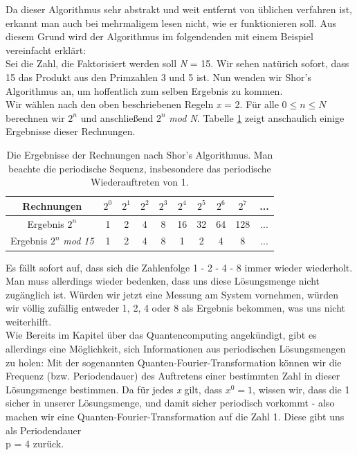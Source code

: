 \documentclass[12pt]{article}
\begin{document}
Da dieser Algorithmus sehr abstrakt und weit entfernt von üblichen verfahren ist, erkannt man auch bei mehrmaligem lesen nicht, wie er funktionieren soll. Aus diesem Grund wird der Algorithmus im folgendenden mit einem Beispiel vereinfacht erklärt: \\

Sei die Zahl, die Faktorisiert werden soll \textit{N} = 15. Wir sehen natürich sofort, dass 15 das Produkt aus den Primzahlen 3 und 5 ist. Nun wenden wir Shor's Algorithmus an, um hoffentlich zum selben Ergebnis zu kommen. \\

Wir wählen nach den oben beschriebenen Regeln \textit{x} = 2. Für alle $0 \leq n \leq N$ berechnen wir $2^n$ und anschließend $2^n$ \textit{mod N}. Tabelle \ref{tab:shor} zeigt anschaulich einige Ergebnisse dieser Rechnungen. \\

\begin{table} [h]
    \centering
    \begin{tabular}{c|c|c|c|c|c|c|c|c|c}
        Rechnungen & $2^0$ & $2^1$ & $2^2$ & $2^3$ & $2^4$ & $2^5$ & $2^6$ & $2^7$ & ...\\
    \hline \hline
        Ergebnis $2^n$ & 1 & 2 & 4 & 8 & 16 & 32 & 64 & 128 & ...\\
    \hline
        Ergebnis $2^n$ \textit{mod 15} & 1 & 2 & 4 & 8 & 1 & 2 & 4 & 8 & ...\\
    \end{tabular}
    \caption{Die Ergebnisse der Rechnungen nach Shor's Algorithmus. Man beachte die periodische Sequenz, insbesondere das periodische Wiederauftreten von 1. \cite{mavroeidis2018impact}}
    \label{tab:shor}
\end{table}

Es fällt sofort auf, dass sich die Zahlenfolge 1 - 2 - 4 - 8 immer wieder wiederholt. Man muss allerdings wieder bedenken, dass uns diese Lösungsmenge nicht zugänglich ist. Würden wir jetzt eine Messung am System vornehmen, würden wir völlig zufällig entweder 1, 2, 4 oder 8 als Ergebnis bekommen, was uns nicht weiterhilft.\\

Wie Bereits im Kapitel über das Quantencomputing angekündigt, gibt es allerdings eine Möglichkeit, sich Informationen aus periodischen Lösungsmengen zu holen: Mit der sogenannten Quanten-Fourier-Transformation können wir die Frequenz (bzw. Periodendauer) des Auftretens einer bestimmten Zahl in dieser Lösungsmenge bestimmen. Da für jedes \textit{x} gilt, dass $x^0 = 1$, wissen wir, dass die 1 sicher in unserer Lösungsmenge, und damit sicher periodisch vorkommt - also machen wir eine Quanten-Fourier-Transformation auf die Zahl 1. Diese gibt uns als Periodendauer \\p = 4 zurück. \\
\end{document}
